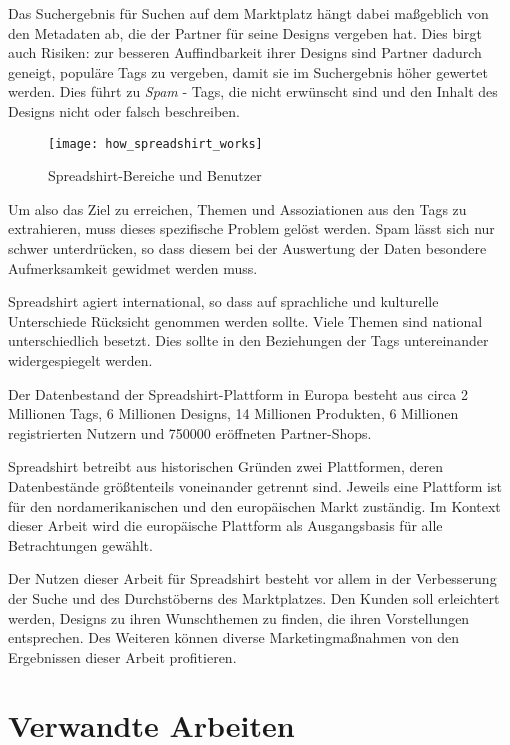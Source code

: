 Das Suchergebnis für Suchen auf dem Marktplatz hängt dabei maßgeblich von den Metadaten ab, die der Partner für seine Designs vergeben hat. Dies birgt auch Risiken: zur besseren Auffindbarkeit ihrer Designs sind Partner dadurch geneigt, populäre Tags zu vergeben, damit sie im Suchergebnis höher gewertet werden. Dies führt zu \emph{Spam} - Tags, die nicht erwünscht sind und den Inhalt des Designs nicht oder falsch beschreiben.

\begin{figure}
\label{fig:howspreadshirtworks}
\begin{center}
    \texttt{[image: how\_spreadshirt\_works]}
\end{center}
\caption{Spreadshirt-Bereiche und Benutzer}
\end{figure}

Um also das Ziel zu erreichen, Themen und Assoziationen aus den Tags zu extrahieren, muss dieses spezifische Problem gelöst werden. Spam lässt sich nur schwer unterdrücken, so dass diesem bei der Auswertung der Daten besondere Aufmerksamkeit gewidmet werden muss.

Spreadshirt agiert international, so dass auf sprachliche und kulturelle Unterschiede Rücksicht genommen werden sollte. Viele Themen sind national unterschiedlich besetzt. Dies sollte in den Beziehungen der Tags untereinander widergespiegelt werden.

Der Datenbestand der Spreadshirt-Plattform in Europa besteht aus circa 2 Millionen Tags, 6 Millionen Designs, 14 Millionen Produkten, 6 Millionen registrierten Nutzern und \num{750000} eröffneten Partner-Shops.

\label{platforms}
Spreadshirt betreibt aus historischen Gründen zwei Plattformen, deren Datenbestände größtenteils voneinander getrennt sind. Jeweils eine Plattform ist für den nordamerikanischen und den europäischen Markt zuständig. Im Kontext dieser Arbeit wird die europäische Plattform als Ausgangsbasis für alle Betrachtungen gewählt.

Der Nutzen dieser Arbeit für Spreadshirt besteht vor allem in der Verbesserung der Suche und des Durchstöberns des Marktplatzes. Den Kunden soll erleichtert werden, Designs zu ihren Wunschthemen zu finden, die ihren Vorstellungen entsprechen. Des Weiteren können diverse Marketingmaßnahmen von den Ergebnissen dieser Arbeit profitieren.

\section{Verwandte Arbeiten}

